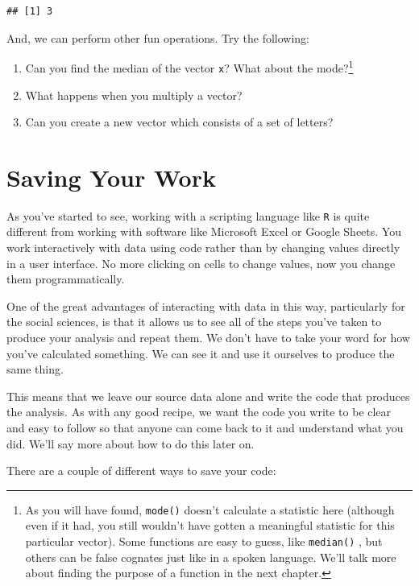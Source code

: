 \documentclass[
]{book}
\begin{document}
\begin{verbatim}
## [1] 3
\end{verbatim}

And, we can perform other fun operations. Try the following:

\begin{enumerate}
\def\labelenumi{\arabic{enumi}.}
\item
  Can you find the median of the vector \texttt{x}? What about the mode?\footnote{As you will have found, \texttt{mode()} doesn't calculate a statistic here (although even if it had, you still wouldn't have gotten a meaningful statistic for this particular vector). Some functions are easy to guess, like \texttt{median()} , but others can be false cognates just like in a spoken language. We'll talk more about finding the purpose of a function in the next chapter.}
\item
  What happens when you multiply a vector?
\item
  Can you create a new vector which consists of a set of letters?
\end{enumerate}

\hypertarget{saving-your-work}{%
\section{Saving Your Work}\label{saving-your-work}}

As you've started to see, working with a scripting language like \texttt{R} is quite different from working with software like Microsoft Excel or Google Sheets. You work interactively with data using code rather than by changing values directly in a user interface. No more clicking on cells to change values, now you change them programmatically.

One of the great advantages of interacting with data in this way, particularly for the social sciences, is that it allows us to see all of the steps you've taken to produce your analysis and repeat them. We don't have to take your word for how you've calculated something. We can see it and use it ourselves to produce the same thing.

This means that we leave our source data alone and write the code that produces the analysis. As with any good recipe, we want the code you write to be clear and easy to follow so that anyone can come back to it and understand what you did. We'll say more about how to do this later on.

There are a couple of different ways to save your code:
\end{document}
